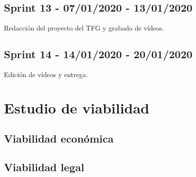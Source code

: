 \subsection{Sprint 13 - 07/01/2020 - 13/01/2020}
Redacción del proyecto del TFG y grabado de vídeos.

\subsection{Sprint 14 - 14/01/2020 - 20/01/2020}
Edición de vídeos y entrega.


\section{Estudio de viabilidad}

\subsection{Viabilidad económica}

\subsection{Viabilidad legal}


